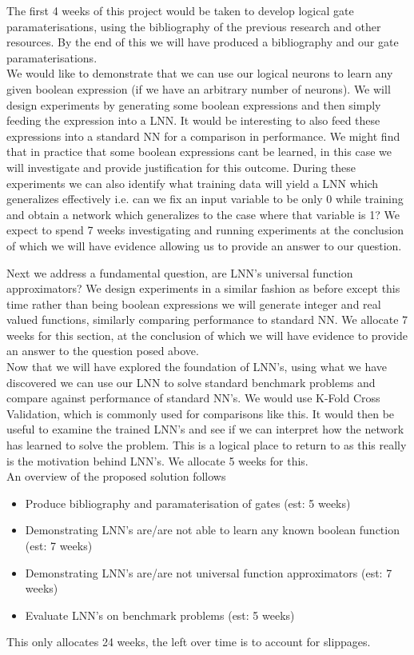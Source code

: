 \documentclass[11pt, a4paper, twoside, openright]{report}
\begin{document}
The first 4 weeks of this project would be taken to develop logical gate paramaterisations, using the bibliography of the previous research and other resources. By the end of this we will have produced a bibliography and our gate paramaterisations.\\

We would like to demonstrate that we can use our logical neurons to learn any given boolean expression (if we have an arbitrary number of neurons). We will design experiments by generating some boolean expressions and then simply feeding the expression into a LNN. It would be interesting to also feed these expressions into a standard NN for a comparison in performance. We might find that in practice that some boolean expressions cant be learned, in this case we will investigate and provide justification for this outcome. During these experiments we can also identify what training data will yield a LNN which generalizes effectively i.e. can we fix an input variable to be only 0 while training and obtain a network which generalizes to the case where that variable  is 1? We expect to spend 7 weeks investigating and running experiments at the conclusion of which we will have evidence allowing us to provide an answer to our question.

Next we address a fundamental question, are LNN's universal function approximators? We design experiments in a similar fashion as before except this time rather than being boolean expressions we will generate integer and real valued functions, similarly comparing performance to standard NN. We allocate 7 weeks for this section, at the conclusion of which we will have evidence to provide an answer to the question posed above. \\

Now that we will have explored the foundation of LNN's, using what we have discovered we can use our LNN to solve standard benchmark problems and compare against performance of standard NN's. We would use K-Fold Cross Validation, which is commonly used for comparisons like this. It would then be useful to examine the trained LNN's and see if we can interpret how the network has learned to solve the problem. This is a logical place to return to as this really is the motivation behind LNN's. We allocate 5 weeks for this. \\

An overview of the proposed solution follows
\begin{itemize}
\item Produce bibliography and paramaterisation of gates (est: 5 weeks)
\item Demonstrating LNN's are/are not able to learn any known boolean function (est: 7 weeks)
\item Demonstrating LNN's are/are not universal function approximators (est: 7 weeks)
\item Evaluate LNN's on benchmark problems (est: 5 weeks)
\end{itemize}
This only allocates 24 weeks, the left over time is to account for slippages.
\end{document}
